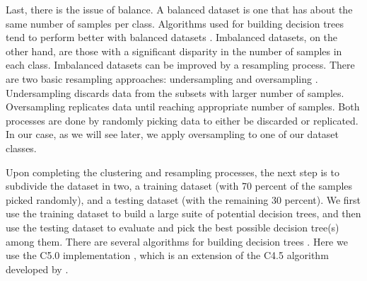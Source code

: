 Last, there is the issue of balance. A balanced dataset is one that has about the same number of samples per class. Algorithms used for building decision trees tend to perform better with balanced datasets \citep[e.g.,][]{Branco_2016_ACMCS, Weiss_2003_JAIR}. Imbalanced datasets, on the other hand, are those with a significant disparity in the number of samples in each class. Imbalanced datasets can be improved by a resampling process. There are two basic resampling approaches: undersampling and oversampling \citep{Branco_2016_ACMCS}. Undersampling discards data from the subsets with larger number of samples. Oversampling replicates data until reaching appropriate number of samples. Both processes are done by randomly picking data to either be discarded or replicated. In our case, as we will see later, we apply oversampling to one of our dataset classes. 


Upon completing the clustering and resampling processes, the next step is to subdivide the dataset in two, a training dataset (with 70 percent of the samples picked randomly), and a testing dataset (with the remaining 30 percent). We first use the training dataset to build a large suite of potential decision trees, and then use the testing dataset to evaluate and pick the best possible decision tree(s) among them. There are several algorithms for building decision trees \citep[e.g., ID3, C4.5, C5.0, CART; see][]{Quinlan_1986_ML, Quinlan_1993_Book, Quinlan_1996_JAIR, Breiman_1984_Book}.  Here we use the C5.0 implementation \citep{Kuhn_2017_Manual}, which is an extension of the C4.5 algorithm developed by \citet{Quinlan_1993_Book, Quinlan_1996_JAIR}.

